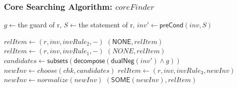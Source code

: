 \documentclass{beamer}
\def \andc {\wedge }
\begin{document}
 \begin{frame}\frametitle{Core Searching Algorithm: $coreFinder$}

{\small
\begin{algorithm}[H]




{
    $g\leftarrow $the guard of r, $S\leftarrow $the statement of r,
    $inv'\leftarrow \mathsf{preCond}(inv, S)$\; \label{line:preCondComp}

    {
    $relItem\leftarrow (r, inv, invRule_2,-)$\;
    \Return $(\mathsf{NONE},  relItem )$\;
    }
    {
    $relItem\leftarrow (r, inv, invRule_1,-)$\;
    \Return $(NONE,  relItem )$\;
    }
    \Else
    {
    $candidates\leftarrow \mathsf{subsets}(\mathsf{decompose}(\mathsf{dualNeg}(inv')\andc g))$\;
    $newInv\leftarrow choose(chk,candidates)$\;
    $relItem\leftarrow (r, inv, invRule_3,newInv)$\;
    {
    $newInv \leftarrow  normalize(newInv)$\;%
    \Return $(\mathsf{SOME}(newInv),   relItem )$\;
    }
    }
}


\end{algorithm}}
 \end{frame}
\end{document}
